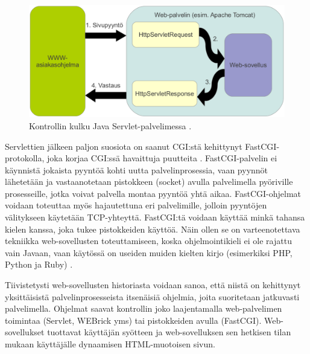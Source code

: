 \begin{figure}[ht]
\centering
\includegraphics[width=\textwidth]{web/servlet.eps}
\caption{Kontrollin kulku Java Servlet-palvelimessa \cite{j2ee}.}%
\label{servlet}
\end{figure}

Servlettien jälkeen paljon suosiota on saanut CGI:stä kehittynyt FastCGI-protokolla, joka korjaa CGI:ssä havaittuja puutteita \cite{fastcgi}. FastCGI-palvelin ei käynnistä jokaista pyyntöä kohti uutta palvelinprosessia, vaan pyynnöt lähetetään ja vas\-taan\-o\-te\-taan pistokkeen (socket) avulla palvelimella pyöriville prosesseille, jotka voivat palvella montaa pyyntöä yhtä aikaa. FastCGI-ohjelmat voidaan toteuttaa myös hajautettuna eri palvelimille, jolloin pyyntöjen välitykseen käytetään TCP-yhteyttä. FastCGI:tä voidaan käyttää minkä tahansa kielen kanssa, joka tukee pistokkeiden käyttöä. Näin ollen se on varteenotettava tekniikka web-sovellusten toteuttamiseen, koska ohjelmointikieli ei ole rajattu vain Javaan, vaan käytössä on useiden muiden kielten kirjo (esimerkiksi PHP, Python ja Ruby) \cite{fastcgi}.

Tiivistetysti web-sovellusten historiasta voidaan sanoa, että niistä on kehittynyt yksittäisistä palvelinprosesseista itsenäisiä ohjelmia, joita suoritetaan jatkuvasti palvelimella. Ohjelmat saavat kontrollin joko laajentamalla web-pal\-ve\-li\-men toimintaa (Servlet, WEBrick yms) tai pistokkeiden avulla (FastCGI). Web-so\-vel\-luk\-set tuottavat käyttäjän syötteen ja web-sovelluksen sen hetkisen tilan mukaan käyttäjälle dynaamisen HTML-muotoisen sivun.